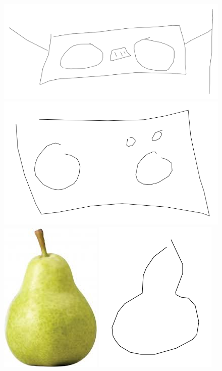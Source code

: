 \documentclass{article}
\begin{document}
\begin{figure}[h]
\includegraphics[scale=0.1]{images/radio00161.png}
\includegraphics[scale=0.1]{images/radio00286.png}\\
\includegraphics[scale=0.15]{images/pear.jpg}
\includegraphics[scale=0.15]{images/pear00008.png}

\end{figure}
\end{document}
